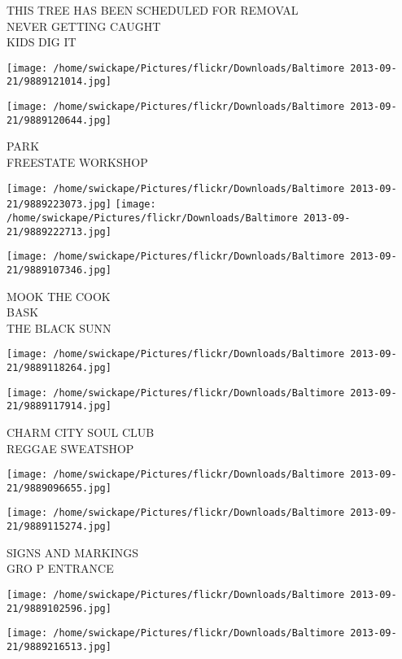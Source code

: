 \documentclass[10pt,letterpaper]{article}
\begin{document}
THIS TREE HAS BEEN SCHEDULED FOR REMOVAL\\
NEVER GETTING CAUGHT\\
KIDS DIG IT
\pagebreak

\texttt{[image: /home/swickape/Pictures/flickr/Downloads/Baltimore 2013-09-21/9889121014.jpg]}

\vspace{0.25in}
\texttt{[image: /home/swickape/Pictures/flickr/Downloads/Baltimore 2013-09-21/9889120644.jpg]}

PARK\\
FREESTATE WORKSHOP
\pagebreak

\texttt{[image: /home/swickape/Pictures/flickr/Downloads/Baltimore 2013-09-21/9889223073.jpg]}
\texttt{[image: /home/swickape/Pictures/flickr/Downloads/Baltimore 2013-09-21/9889222713.jpg]}

\texttt{[image: /home/swickape/Pictures/flickr/Downloads/Baltimore 2013-09-21/9889107346.jpg]}

MOOK THE COOK\\
BASK\\
THE BLACK SUNN
\pagebreak

\texttt{[image: /home/swickape/Pictures/flickr/Downloads/Baltimore 2013-09-21/9889118264.jpg]}

\vspace{0.25in}
\texttt{[image: /home/swickape/Pictures/flickr/Downloads/Baltimore 2013-09-21/9889117914.jpg]}

CHARM CITY SOUL CLUB\\
REGGAE SWEATSHOP
\pagebreak

\texttt{[image: /home/swickape/Pictures/flickr/Downloads/Baltimore 2013-09-21/9889096655.jpg]}

\vspace{0.25in}
\texttt{[image: /home/swickape/Pictures/flickr/Downloads/Baltimore 2013-09-21/9889115274.jpg]}

SIGNS AND MARKINGS\\
GRO P ENTRANCE
\pagebreak

\texttt{[image: /home/swickape/Pictures/flickr/Downloads/Baltimore 2013-09-21/9889102596.jpg]}

\vspace{0.25in}
\texttt{[image: /home/swickape/Pictures/flickr/Downloads/Baltimore 2013-09-21/9889216513.jpg]}
\end{document}
